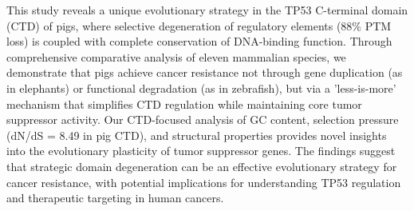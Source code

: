 This study reveals a unique evolutionary strategy in the TP53 C-terminal domain (CTD) of pigs, where selective degeneration of regulatory elements (88\% PTM loss) is coupled with complete conservation of DNA-binding function. Through comprehensive comparative analysis of eleven mammalian species, we demonstrate that pigs achieve cancer resistance not through gene duplication (as in elephants) or functional degradation (as in zebrafish), but via a 'less-is-more' mechanism that simplifies CTD regulation while maintaining core tumor suppressor activity. Our CTD-focused analysis of GC content, selection pressure (dN/dS = 8.49 in pig CTD), and structural properties provides novel insights into the evolutionary plasticity of tumor suppressor genes. The findings suggest that strategic domain degeneration can be an effective evolutionary strategy for cancer resistance, with potential implications for understanding TP53 regulation and therapeutic targeting in human cancers.
